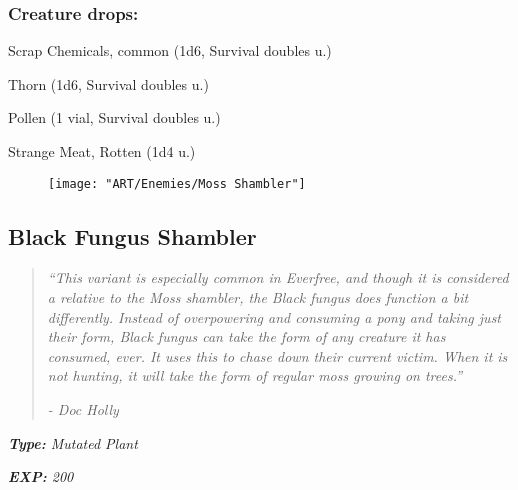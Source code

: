 \documentclass[11pt,a4paper,twocolumn]{book}
\begin{document}
	\subsubsection*{Creature drops:}
	\begin{compactitem}
		\item Scrap Chemicals, common (1d6, Survival doubles u.)
		\item Thorn (1d6, Survival doubles u.)
		\item Pollen (1 vial, Survival doubles u.)
		\item Strange Meat, Rotten (1d4 u.)
	\end{compactitem}
	
	\begin{figure}[h]
		\centering
		\texttt{[image: "ART/Enemies/Moss Shambler"]}
	\end{figure}	
	
	\clearpage	
	\subsection*{Black Fungus Shambler}
	\begin{quote}
		\emph{``This variant is especially common in Everfree, and though it is considered a relative to the Moss shambler, the Black fungus does function a bit differently. Instead of overpowering and consuming a pony and taking just their form, Black fungus can take the form of any creature it has consumed, ever. It uses this to chase down their current victim. When it is not hunting, it will take the form of regular moss growing on trees.''}
		
		\emph{-	Doc Holly}
	\end{quote}
	
	\noindent
	\emph{\textbf{Type:} Mutated Plant}
	
	\noindent
	\emph{\textbf{EXP:} 200}
	
%		
%	
%		
\end{document}
